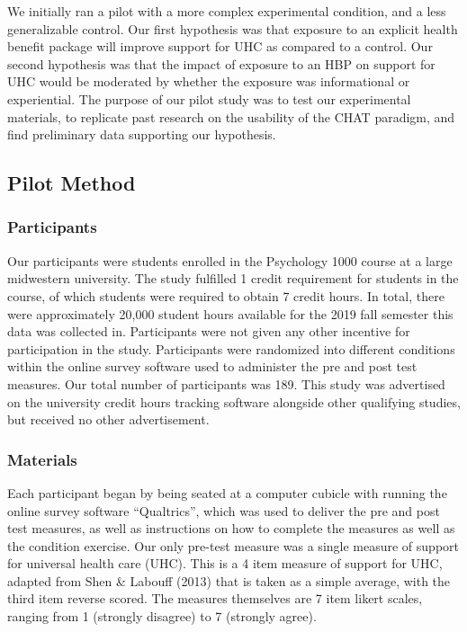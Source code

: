 \documentclass[
]{article}
\begin{document}
We initially ran a pilot with a more complex experimental condition, and
a less generalizable control. Our first hypothesis was that exposure to
an explicit health benefit package will improve support for UHC as
compared to a control. Our second hypothesis was that the impact of
exposure to an HBP on support for UHC would be moderated by whether the
exposure was informational or experiential. The purpose of our pilot
study was to test our experimental materials, to replicate past research
on the usability of the CHAT paradigm, and find preliminary data
supporting our hypothesis.

\hypertarget{pilot-method}{%
\subsection{Pilot Method}\label{pilot-method}}

\hypertarget{participants}{%
\subsubsection{Participants}\label{participants}}

Our participants were students enrolled in the Psychology 1000 course at
a large midwestern university. The study fulfilled 1 credit requirement
for students in the course, of which students were required to obtain 7
credit hours. In total, there were approximately 20,000 student hours
available for the 2019 fall semester this data was collected in.
Participants were not given any other incentive for participation in the
study. Participants were randomized into different conditions within the
online survey software used to administer the pre and post test
measures. Our total number of participants was 189. This study was
advertised on the university credit hours tracking software alongside
other qualifying studies, but received no other advertisement.

\hypertarget{materials}{%
\subsubsection{Materials}\label{materials}}

Each participant began by being seated at a computer cubicle with
running the online survey software ``Qualtrics'', which was used to
deliver the pre and post test measures, as well as instructions on how
to complete the measures as well as the condition exercise. Our only
pre-test measure was a single measure of support for universal health
care (UHC). This is a 4 item measure of support for UHC, adapted from
Shen \& Labouff (2013) that is taken as a simple average, with the third
item reverse scored. The measures themselves are 7 item likert scales,
ranging from 1 (strongly disagree) to 7 (strongly agree).
\end{document}
